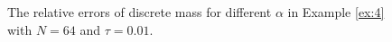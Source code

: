 \begin{figure}[H]
\begin{center}
 \caption{The relative errors of discrete mass for different $\alpha$ in Example \ref{ex:4} with $N = 64$ and $\tau=0.01$.} \label{fig:11}
\end{center}
\end{figure}


